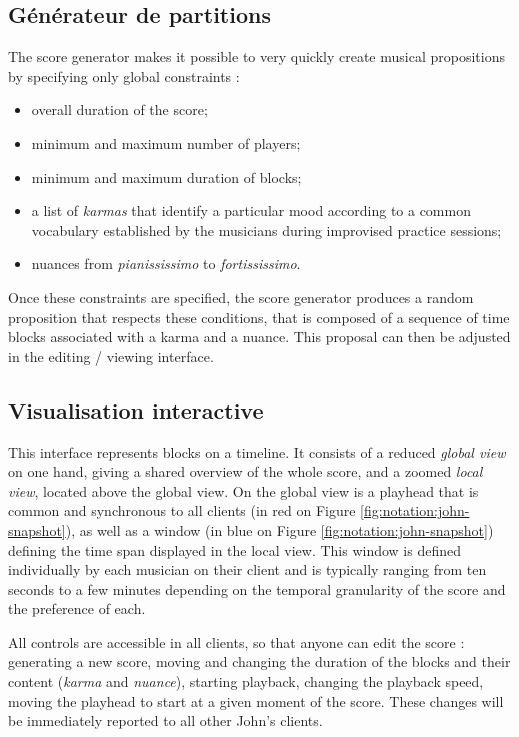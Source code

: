 \subsection{Générateur de partitions}

The score generator makes it possible to very quickly create musical propositions by specifying only global constraints :
\begin{itemize}[noitemsep]
\item overall duration of the score;
\item minimum and maximum number of players;
\item minimum and maximum duration of blocks;
\item a list of \textit{karmas} that identify a particular mood according to a common vocabulary established by the musicians during improvised practice sessions;
\item nuances from \textit{pianississimo} to \textit{fortississimo}.
\end{itemize}

Once these constraints are specified, the score generator produces a random proposition that respects these conditions, that is composed of a sequence of time blocks associated with a karma and a nuance. This proposal can then be adjusted in the editing / viewing interface.

\subsection{Visualisation interactive}

This interface represents blocks on a timeline. It consists of a reduced \textit{global view} on one hand, giving a shared overview of the whole score, and a zoomed \textit{local view}, located above the global view. On the global view is a playhead that is common and synchronous to all clients (in red on Figure \ref{fig:notation:john-snapshot}), as well as a window (in blue on Figure \ref{fig:notation:john-snapshot}) defining the time span displayed in the local view. This window is defined individually by each musician on their client and is typically ranging from ten seconds to a few minutes depending on the temporal granularity of the score and the preference of each.

All controls are accessible in all clients, so that anyone can edit the score : generating a new score, moving and changing the duration of the blocks and their content (\textit{karma} and \textit{nuance}), starting playback, changing the playback speed, moving the playhead to start at a given moment of the score. These changes will be immediately reported to all other John's clients.

